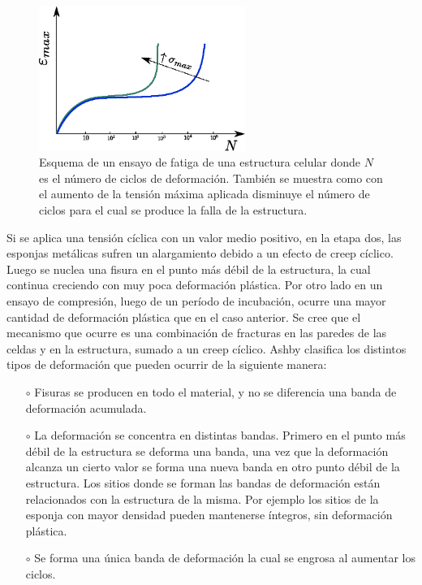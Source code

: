 \documentclass[a4paper,12pt,fleqn,twoside,openany]{book}
\begin{document}
\begin{figure}[h]
 \centering
 \includegraphics[width=0.6\textwidth]{fatiga.eps}
 \caption{Esquema de un ensayo de fatiga de una estructura celular donde $N$ es el número de ciclos de deformación. También se muestra como con el aumento de la tensión máxima aplicada disminuye el 
 número de ciclos para el cual se produce la falla de la estructura.} 
 \label{fig:memoria}
 \end{figure}

Si se aplica una tensión cíclica con un valor medio positivo, en la etapa dos, las esponjas metálicas sufren un alargamiento debido a un efecto de 
creep cíclico. Luego se nuclea una fisura en el punto más débil de la estructura, la cual continua creciendo con muy poca deformación plástica. 
Por otro lado en un ensayo de compresión, luego de un período de incubación, ocurre una mayor cantidad de deformación plástica que en el caso 
anterior. Se cree que el mecanismo que ocurre es una combinación de fracturas en las paredes de las celdas y en la estructura, sumado a un creep 
cíclico. Ashby \cite{design} clasifica los distintos tipos de deformación que pueden ocurrir de la siguiente manera:
\begin{itemize}
 \item[$\circ$] Fisuras se producen en todo el material, y no se diferencia una banda de deformación acumulada. 
 \item[$\circ$] La deformación se concentra en distintas bandas. Primero en el punto más débil de la estructura se deforma una banda, una vez que la deformación 
 alcanza un cierto valor se forma una nueva banda en otro punto débil de la estructura. Los sitios donde se forman las bandas de deformación están relacionados 
 con la estructura de la misma. 
 Por ejemplo los sitios de la esponja con mayor densidad pueden mantenerse íntegros, sin deformación plástica.   
 \item[$\circ$] Se forma una única banda de deformación la cual se engrosa al aumentar los ciclos.
 \end{itemize}
\end{document}

